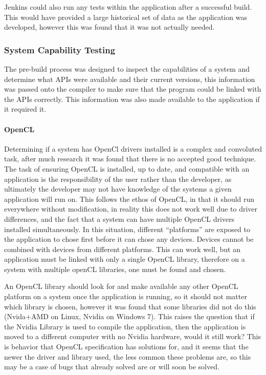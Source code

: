 \documentclass[12pt,a4paper]{article}
\begin{document}
Jenkins could also run any tests within the application after a successful build. This would have provided a large historical set of data as the application was developed, however this was found that it was not actually needed.



\subsubsection{System Capability Testing}
The pre-build process was designed to inspect the capabilities of a system and determine what APIs were available and their current versions, this information was passed onto the compiler to make sure that the program could be linked with the APIs correctly. This information was also made available to the application if it required it.
\paragraph{OpenCL}
Determining if a system has OpenCl drivers installed is a complex and convoluted task, after much research it was found that there is no accepted good technique. The task of ensuring OpenCL is installed, up to date, and compatible with an application is the responsibility of the user rather than the developer, as ultimately the developer may not have knowledge of the systems a given application will run on. This follows the ethos of OpenCL, in that it should run everywhere without modification, in reality this does not work well due to driver differences, and the fact that a system can have multiple OpenCL drivers installed simultaneously. In this situation, different “platforms” are exposed to the application to chose first before it can chose any devices.  Devices cannot be combined with devices from different platforms. This can work well, but an application must be linked with only a single OpenCL library, therefore on a system with multiple openCL libraries, one must be found and chosen.

An OpenCL library should look for and make available any other OpenCL platform on a system once the application is running, so it should not matter which library is chosen, however it was found that some libraries did not do this (Nvida+AMD on Linux, Nvidia on Windows 7). This raises the question that if the Nvidia Library is used to compile the application, then the application is moved to a different computer with no Nvidia hardware, would it still work? This is behavior that OpenCL specification has solutions for, and it seems that the newer the driver and library used, the less common these problems are, so this may be a case of bugs that already solved are or will soon be solved.
\end{document}

